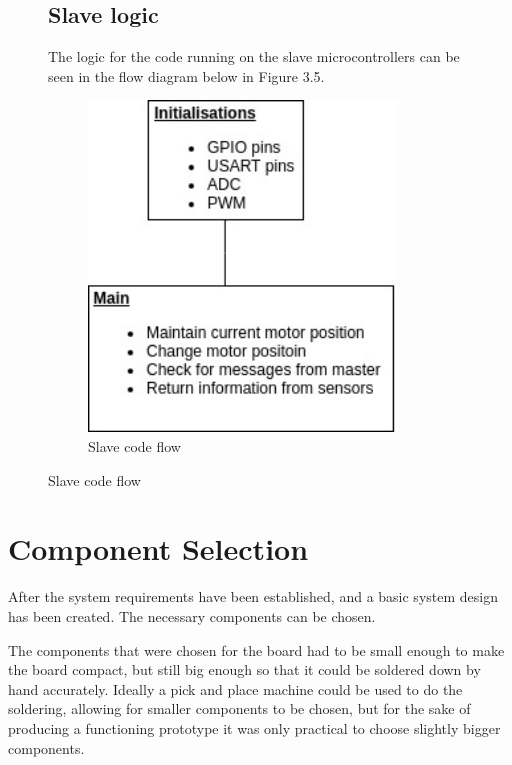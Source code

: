 \begin{figure}[H]
\begin{minipage}[b]{0.45\textwidth}
    \subsection{Slave logic}
    The logic for the code running on the slave microcontrollers can be seen in the flow diagram below in Figure 3.5.
    \vspace{5mm}
    \begin{figure}[H]
    \centering
    \includegraphics[width=0.9\textwidth]{Slave_flow.jpg}
    \caption{Slave code flow}
    \label{fig:SLAVEFLOW}
    \end{figure} 
  \end{minipage}
\end{figure}
\vspace{-5mm}

\newpage
\section{Component Selection}
After the system requirements have been established, and a basic system design has been created. The necessary components can be chosen.

The components that were chosen for the board had to be small enough to make the board compact, but still big enough so that it could be soldered down by hand accurately. Ideally a pick and place machine could be used to do the soldering, allowing for smaller components to be chosen, but for the sake of producing a functioning prototype it was only practical to choose slightly bigger components.


